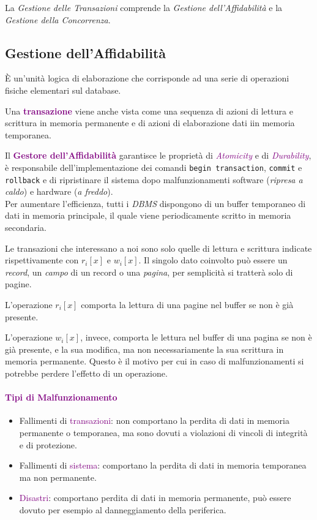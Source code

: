 La \emph{Gestione delle Transazioni} comprende la \emph{Gestione dell'Affidabilità} e
la \emph{Gestione della Concorrenza}.

\subsection{Gestione dell'Affidabilità}

\begin{definition}[Transazione]
    È un'unità logica di elaborazione che corrisponde ad una serie
    di operazioni fisiche elementari sul database.

    Una \textbf{\textcolor{purple}{transazione}} viene anche vista come una sequenza di azioni
    di lettura e scrittura in memoria permanente e di azioni di elaborazione dati iin memoria temporanea.
\end{definition}

Il \textbf{\textcolor{purple}{Gestore dell'Affidabilità}} garantisce le proprietà di
\emph{\textcolor{purple}{Atomicity}} e di \emph{\textcolor{purple}{Durability}}, è
responsabile dell'implementazione dei comandi \verb|begin transaction|, \verb|commit| e
\verb|rollback| e di ripristinare il sistema dopo malfunzionamenti software (\emph{ripresa a caldo})
e hardware (\emph{a freddo}). \\

Per aumentare l'efficienza, tutti i \emph{DBMS} dispongono di un buffer
temporaneo di dati in memoria principale, il quale viene periodicamente scritto
in memoria secondaria.

Le transazioni che interessano a noi sono solo quelle di lettura e scrittura
indicate rispettivamente con $r_i[x]$ e $w_i[x]$. Il singolo dato coinvolto può
essere un \emph{record}, un \emph{campo} di un record o una \emph{pagina}, per semplicità
si tratterà solo di pagine.

L'operazione $r_i[x]$ comporta la lettura di una pagine nel buffer se non è già presente.

L'operazione $w_i[x]$, invece, comporta le lettura nel buffer di una pagina se non è
già presente, e la sua modifica, ma non necessariamente la sua scrittura in memoria permanente.
Questo è il motivo per cui in caso di malfunzionamenti si potrebbe perdere l'effetto
di un operazione.

\paragraph{\textcolor{purple}{Tipi di Malfunzionamento}}
\begin{itemize}
    \item Fallimenti di \textcolor{purple}{transazioni}: non comportano la perdita di dati
        in memoria permanente o temporanea, ma sono dovuti a violazioni di vincoli di integrità e
        di protezione.
    \item Fallimenti di \textcolor{purple}{sistema}: comportano la perdita di dati in memoria
        temporanea ma non permanente.
    \item \textcolor{purple}{Disastri}: comportano perdita di dati in memoria permanente, può
        essere dovuto per esempio al danneggiamento della periferica.
\end{itemize}

